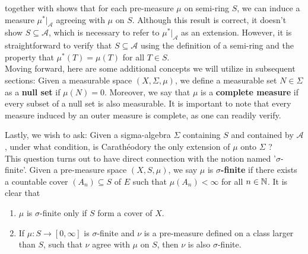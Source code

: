 \documentclass{report}
\begin{document}
\begin{mdframed}
 together with  shows that for each pre-measure $\mu$ on semi-ring $S$, we can induce a measure $\mu^*|_{\mathcal{A}}$ agreeing with $\mu$ on $S$. Although this result is correct, it doesn't show $S \subseteq \mathcal{A}$, which is necessary to refer to $\mu^*|_{\mathcal{A}}$ as an extension. However, it is straightforward to verify that $S \subseteq \mathcal{A}$ using the definition of a semi-ring and the property that $\mu^*(T) = \mu(T)$ for all $T \in S$.\\

Moving forward, here are some additional concepts we will utilize in subsequent sections: Given a measurable space $(X,\Sigma,\mu)$, we define a measurable set $N \in \Sigma$ as a \textbf{null set} if $\mu(N) = 0$. Moreover, we say that $\mu$ is a \textbf{complete measure} if every subset of a null set is also measurable. It is important to note that every measure induced by an outer measure is complete, as one can readily verify.
\end{mdframed}
\begin{mdframed}
Lastly, we wish to ask: Given a sigma-algebra $\Sigma$ containing $S$ and contained by $\mathcal{A}$, under what condition, is Carathéodory the only extension of $\mu$ onto $\Sigma$ ? \\

This question turns out to have direct connection with the notion named '$\sigma$-finite'. Given a pre-measure space $(X,S,\mu)$, we say $\mu$ is \textbf{$\sigma$-finite} if there exists a countable cover $(A_n)\subseteq S$ of $E$ such that  $\mu (A_n)<\infty$ for all $n\in\mathbb{N}$. It is clear that   \begin{enumerate}[label=(\alph*)]  
  \item $\mu$ is $\sigma$-finite only if $S$ form a cover of $X$. 
  \item If $\mu:S\rightarrow [0,\infty]$ is $\sigma$-finite and $\nu $ is a pre-measure defined on a class larger than $S$, such that $\nu $ agree with $\mu$ on $S$, then  $\nu $ is also $\sigma$-finite.
\end{enumerate}
\end{mdframed}
\end{document}

